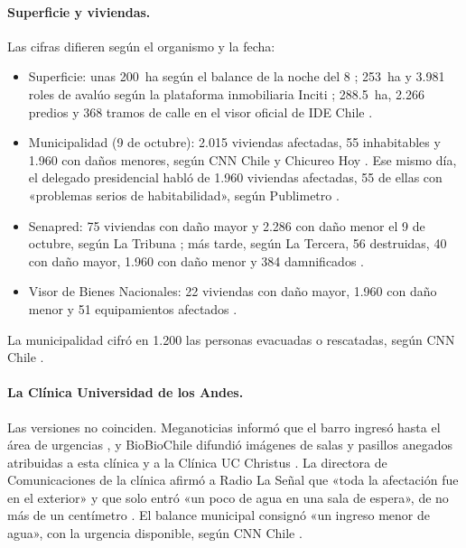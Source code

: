 \paragraph{Superficie y viviendas.} Las cifras difieren según el organismo y la fecha:
\begin{itemize}
\item Superficie: unas \SI{200}{ha} según el balance de la noche del 8 \citep{wikipedia2026}; \SI{253}{ha} y 3.981 roles de avalúo según la plataforma inmobiliaria Inciti \citep{chicureohoy2026}; \SI{288,5}{ha}, 2.266 predios y 368 tramos de calle en el visor oficial de IDE Chile \citep{bbnn2026visor}.
\item Municipalidad (9 de octubre): 2.015 viviendas afectadas, 55 inhabitables y 1.960 con daños menores, según CNN Chile y Chicureo Hoy \citep{cnnchile2026balance,chicureohoy2026}. Ese mismo día, el delegado presidencial habló de 1.960 viviendas afectadas, 55 de ellas con «problemas serios de habitabilidad», según Publimetro \citep{publimetro2026}.
\item Senapred: 75 viviendas con daño mayor y 2.286 con daño menor el 9 de octubre, según La Tribuna \citep{latribuna2026}; más tarde, según La Tercera, 56 destruidas, 40 con daño mayor, 1.960 con daño menor y 384 damnificados \citep{latercera2026senapred}.
\item Visor de Bienes Nacionales: 22 viviendas con daño mayor, 1.960 con daño menor y 51 equipamientos afectados \citep{bbnn2026visor}.
\end{itemize}
La municipalidad cifró en 1.200 las personas evacuadas o rescatadas, según CNN Chile \citep{cnnchile2026balance}.

\paragraph{La Clínica Universidad de los Andes.} Las versiones no coinciden. Meganoticias informó que el barro ingresó hasta el área de urgencias \citep{meganoticias2026urgencia}, y BioBioChile difundió imágenes de salas y pasillos anegados atribuidas a esta clínica y a la Clínica UC Christus \citep{biobio2026clinicas}. La directora de Comunicaciones de la clínica afirmó a Radio La Señal que «toda la afectación fue en el exterior» y que solo entró «un poco de agua en una sala de espera», de no más de un centímetro \citep{radiolasenal2026}. El balance municipal consignó «un ingreso menor de agua», con la urgencia disponible, según CNN Chile \citep{cnnchile2026balance}.


